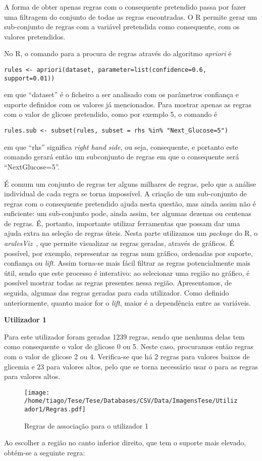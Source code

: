 A forma de obter apenas regras com o consequente pretendido passa por fazer uma filtragem do conjunto de todas as regras encontradas. O R permite gerar um sub-conjunto de regras com a variável pretendida como consequente, com os valores pretendidos.


No R, o comando para a procura de regras através do algoritmo \textit{apriori} é

\begin{lstlisting}
rules <- apriori(dataset, parameter=list(confidence=0.6, support=0.01))
\end{lstlisting}
em que ``dataset'' é o ficheiro a ser analisado com os parâmetros confiança e suporte definidos com os valores já mencionados. Para mostrar apenas as regras com o valor de glicose pretendido, como por exemplo 5, o comando é

\begin{lstlisting}
rules.sub <- subset(rules, subset = rhs %in% "Next_Glucose=5")
\end{lstlisting}
em que ``rhs'' significa \textit{right hand side}, ou seja, consequente, e portanto este comando gerará então um subconjunto de regras em que o consequente será ``Next\textunderscore Glucose=5''.

É comum um conjunto de regras ter alguns milhares de regras, pelo que a análise individual de cada regra se torna impossível. A criação de um sub-conjunto de regras com o consequente pretendido ajuda nesta questão, mas ainda assim não é suficiente: um sub-conjunto pode, ainda assim, ter algumas dezenas ou centenas de regras. É, portanto, importante utilizar ferramentas que possam dar uma ajuda extra na seleção de regras úteis. Nesta parte utilizamos um \textit{package} do R, o \textit{arulesViz}~\cite{arulesviz}, que permite visualizar as regras geradas, através de gráficos. É possível, por exemplo, representar as regras num gráfico, ordenadas por suporte, confiança ou \textit{lift}. Assim torna-se mais fácil filtrar as regras potencialmente mais útil, sendo que este processo é interativo: ao selecionar uma região no gráfico, é possível mostrar todas as regras presentes nessa região. 
Apresentamos, de seguida, algumas das regras geradas para cada utilizador. Como definido anteriormente, quanto maior for o \textit{lift}, maior é a dependência entre as variáveis.

\textbf{Utilizador 1}

Para este utilizador foram geradas 1239 regras, sendo que nenhuma delas tem como consequente o valor de glicose 0 ou 5. Neste caso, procuramos então regras com o valor de glicose 2 ou 4. Verifica-se que há 2 regras para valores baixos de glicemia e 23 para valores altos, pelo que se torna necessário usar o  para as regras para valores altos. 
\begin{figure}[H]
\centering
\texttt{[image: /home/tiago/Tese/Tese/Databases/CSV/Data/ImagensTese/Utilizador1/Regras.pdf]}
\caption{Regras de associação para o utilizador 1}
\end{figure}
Ao escolher a região no canto inferior direito, que tem o suporte mais elevado, obtém-se a seguinte regra:

